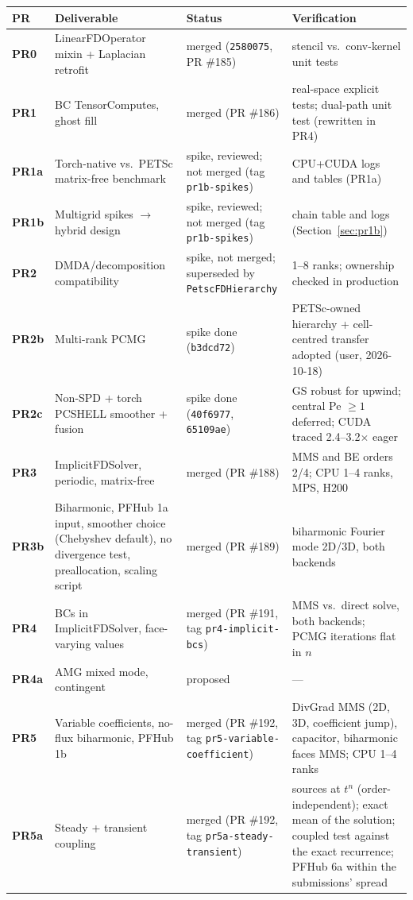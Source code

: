 \documentclass[11pt]{article}
\begin{document}
\begin{longtable}{>{\bfseries}p{} p{} p{} p{}}
\toprule
PR & Deliverable & Status & Verification \\
\midrule
\endhead
PR0 & LinearFDOperator mixin + Laplacian retrofit & merged (\texttt{2580075}, PR \#185) & stencil vs.\ conv-kernel unit tests \\
PR1 & BC TensorComputes, ghost fill & merged (PR \#186) & real-space explicit tests; dual-path unit test (rewritten in PR4) \\
PR1a & Torch-native vs.\ PETSc matrix-free benchmark & spike, reviewed; not merged (tag \texttt{pr1b-spikes}) & CPU+CUDA logs and tables (PR1a) \\
PR1b & Multigrid spikes $\to$ hybrid design & spike, reviewed; not merged (tag \texttt{pr1b-spikes}) & chain table and logs (Section~\ref{sec:pr1b}) \\
PR2 & DMDA/decomposition compatibility & spike, not merged; superseded by \texttt{PetscFDHierarchy} & 1--8 ranks; ownership checked in production \\
PR2b & Multi-rank PCMG & spike done (\texttt{b3dcd72}) & PETSc-owned hierarchy + cell-centred transfer adopted (user, 2026-10-18) \\
PR2c & Non-SPD + torch PCSHELL smoother + fusion & spike done (\texttt{40f6977}, \texttt{65109ae}) & GS robust for upwind; central Pe $\ge1$ deferred; CUDA traced 2.4--3.2$\times$ eager \\
PR3 & ImplicitFDSolver, periodic, matrix-free & merged (PR \#188) & MMS and BE orders 2/4; CPU 1--4 ranks, MPS, H200 \\
PR3b & Biharmonic, PFHub 1a input, smoother choice (Chebyshev default), no divergence test, preallocation, scaling script & merged (PR \#189) & biharmonic Fourier mode 2D/3D, both backends \\
PR4 & BCs in ImplicitFDSolver, face-varying values & merged (PR \#191, tag \texttt{pr4-implicit-bcs}) & MMS vs.\ direct solve, both backends; PCMG iterations flat in $n$ \\
PR4a & AMG mixed mode, contingent & proposed & --- \\
PR5 & Variable coefficients, no-flux biharmonic, PFHub 1b & merged (PR \#192, tag \texttt{pr5-variable-coefficient}) & DivGrad MMS (2D, 3D, coefficient jump), capacitor, biharmonic faces MMS; CPU 1--4 ranks \\
PR5a & Steady + transient coupling & merged (PR \#192, tag \texttt{pr5a-steady-transient}) & sources at $t^n$ (order-independent); exact mean of the solution; coupled test against the exact recurrence; PFHub 6a within the submissions' spread \\

\end{longtable}
\end{document}
